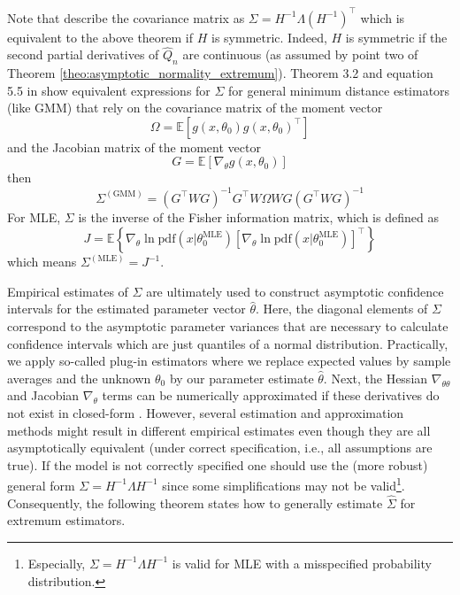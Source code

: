 Note that \cite[Theorem H.1]{PP97} describe the covariance matrix as $\Sigma = H^{-1} \Lambda (H^{-1})^{\top}$ which is equivalent to the above theorem if $H$ is symmetric. 
Indeed, $H$ is symmetric if the second partial derivatives of $\hat{Q}_n$ are continuous (as assumed by point two of Theorem \ref{theo:asymptotic_normality_extremum}).
Theorem 3.2 and equation 5.5 in \cite{NM94} show equivalent expressions for $\Sigma$ for general minimum distance estimators (like GMM) that rely on the covariance matrix of the moment vector
\[
\Omega = \mathbb{E} \left[ g(x,\theta_0) g(x,\theta_0)^{\top} \right]
\]
and the Jacobian matrix of the moment vector
\[
G = \mathbb{E} \left[ \nabla_{\theta} g(x, \theta_0) \right]
\]
then
\[
\Sigma^{(\mathrm{GMM})} = 
\left( G^{\top} W G \right) ^{-1}
G^{\top} W \Omega W G
\left( G^{\top} W G \right) ^{-1}
\]
For MLE, $\Sigma$ is the inverse of the Fisher information matrix, which is defined as
\begin{equation}
	\label{eq:fisher_information_matrix}
	J = \mathbb{E} \left\{ \nabla_{\theta} \ln \mathrm{pdf} (x | \theta_0^{\mathrm{MLE}}) \left[ \nabla_{\theta} \ln \mathrm{pdf} (x | \theta_0^{\mathrm{MLE}}) \right]^{\top} \right\}
\end{equation}
which means $\Sigma^{(\mathrm{MLE})} = J^{-1}$.

Empirical estimates of $\Sigma$ are ultimately used to construct asymptotic confidence intervals for the estimated parameter vector $\hat{\theta}$.
Here, the diagonal elements of $\Sigma$ correspond to the asymptotic parameter variances that are necessary to calculate confidence intervals which are just quantiles of a normal distribution.
Practically, we apply so-called plug-in estimators where we replace expected values by sample averages and the unknown $\theta_0$ by our parameter estimate $\hat{\theta}$.
Next, the Hessian $\nabla_{\theta \theta}$ and Jacobian $\nabla_{\theta}$ terms can be numerically approximated if these derivatives do not exist in closed-form \citep{NW06}.
However, several estimation and approximation methods might result in different empirical estimates even though they are all asymptotically equivalent (under correct specification, i.e., all assumptions are true). 
If the model is not correctly specified one should use the (more robust) general form $\Sigma = H^{-1} \Lambda H^{-1}$ since some simplifications may not be valid\footnote{Especially, $\Sigma = H^{-1} \Lambda H^{-1}$ is valid for MLE with a misspecified probability distribution.}.
Consequently, the following theorem states how to generally estimate $\hat{\Sigma}$ for extremum estimators.

